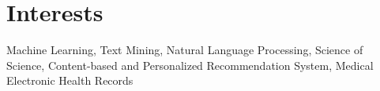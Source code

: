 \section{\sc Interests}

Machine Learning, Text Mining, Natural Language Processing, Science of Science, Content-based and Personalized Recommendation System, Medical Electronic Health Records
